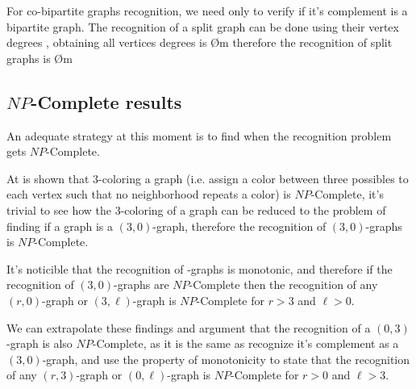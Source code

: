 For co-bipartite graphs recognition, we need only to verify if it's complement is a bipartite graph. The recognition of a split graph can be done using their vertex degrees \cite{??}, obtaining all vertices degrees is \O{m} therefore the recognition of split graphs is \O{m}

\subsection{$NP$-Complete results}

An adequate strategy at this moment is to find when the recognition problem gets $NP$-Complete.

At \cite{gareyjohnson} is shown that 3-coloring a graph (i.e. assign a color between three possibles to each vertex such that no neighborhood repeats a color) is $NP$-Complete, it's trivial to see how the 3-coloring of a graph can be reduced to the problem of finding if a graph is a $(3,0)$-graph, therefore the recognition of $(3,0)$-graphs is $NP$-Complete.

It's noticible that the recognition of \RL-graphs is monotonic, and therefore if the recognition of $(3,0)$-graphs are $NP$-Complete then the recognition of any $(r,0)$-graph or $(3,\ell)$-graph is $NP$-Complete for $r > 3$ and $\ell >0$.

We can extrapolate these findings and argument that the recognition of a $(0,3)$-graph is also $NP$-Complete, as it is the same as recognize it's complement as a $(3,0)$-graph, and use the property of monotonicity to state that the recognition of any $(r,3)$-graph or $(0,\ell)$-graph is $NP$-Complete for $r > 0$ and $\ell >3$.

